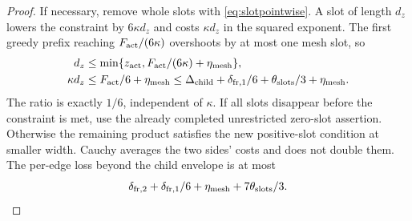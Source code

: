 \begin{proof}
If necessary, remove whole slots with \eqref{eq:slotpointwise}. A slot of length $d_z$ lowers the constraint by $6\kappa d_z$ and costs $\kappa d_z$ in the squared exponent. The first greedy prefix reaching $F_{\rm act}/(6\kappa)$ overshoots by at most one mesh slot, so
\begin{align}
 d_z&\le\min\{z_{\rm act},F_{\rm act}/(6\kappa)+\eta_{\rm mesh}\},\notag\\
 \kappa d_z&\le F_{\rm act}/6+\eta_{\rm mesh}
 \le\Delta_{\rm child}+\delta_{{\rm fr},1}/6
                        +\theta_{\rm slots}/3+\eta_{\rm mesh}.\label{eq:greedynew}
\end{align}
The ratio is exactly $1/6$, independent of $\kappa$. If all slots disappear before the constraint is met, use the already completed unrestricted zero-slot assertion. Otherwise the remaining product satisfies the new positive-slot condition at smaller width. Cauchy averages the two sides' costs and does not double them. The per-edge loss beyond the child envelope is at most
\begin{equation}\label{eq:edgeloss}
 \delta_{{\rm fr},2}+\delta_{{\rm fr},1}/6+\eta_{\rm mesh}
                          +7\theta_{\rm slots}/3.
\end{equation}


\end{proof}

